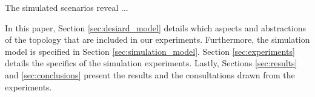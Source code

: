 The simulated scenarios reveal ...

In this paper, Section \ref{sec:desiard_model} details which aspects and abstractions of the \xcloud{} topology that are included in our experiments. Furthermore, the simulation model is specified in Section \ref{sec:simulation_model}. Section \ref{sec:experiments} details the specifics of the simulation experiments. Lastly, Sections \ref{sec:results} and \ref{sec:conclusions} present the results and the consultations drawn from the experiments.



